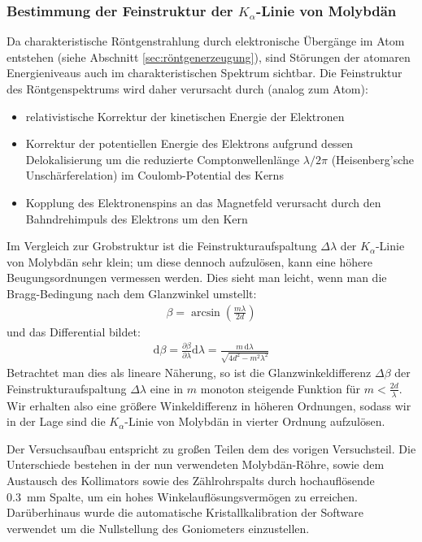 \documentclass[11pt, a4paper]{article}
\begin{document}
\subsubsection{Bestimmung der Feinstruktur der $K_\alpha$-Linie von Molybdän}
Da charakteristische Röntgenstrahlung durch elektronische Übergänge im Atom entstehen (siehe Abschnitt \ref{sec:röntgenerzeugung}), sind Störungen der atomaren Energieniveaus auch im charakteristischen Spektrum sichtbar.
Die Feinstruktur des Röntgenspektrums wird daher verursacht durch (analog zum Atom):
\begin{itemize}
  \item relativistische Korrektur der kinetischen Energie der Elektronen
  
  \item Korrektur der potentiellen Energie des Elektrons aufgrund dessen Delokalisierung um die reduzierte Comptonwellenlänge $\lambda / 2\pi$ (Heisenberg'sche Unschärferelation) im Coulomb-Potential des Kerns
  
  \item Kopplung des Elektronenspins an das Magnetfeld verursacht durch den Bahndrehimpuls des Elektrons um den Kern
\end{itemize}
Im Vergleich zur Grobstruktur ist die Feinstrukturaufspaltung $\Delta \lambda$ der $K_\alpha$-Linie von Molybdän sehr klein; um diese dennoch aufzulösen, kann eine höhere Beugungsordnungen vermessen werden.
Dies sieht man leicht, wenn man die Bragg-Bedingung nach dem Glanzwinkel umstellt:
\begin{align}
  \beta = \arcsin \left( \frac{m \lambda}{2 d} \right)
\end{align}
und das Differential bildet:
\begin{align}
  \mathrm{d}\beta = \frac{\partial \beta}{\partial \lambda} \mathrm{d}\lambda = \frac{m\, \mathrm{d}\lambda}{\sqrt{4 d^2 - m^2 \lambda^2}}
\end{align}
Betrachtet man dies als lineare Näherung, so ist die Glanzwinkeldifferenz $\Delta \beta$ der Feinstrukturaufspaltung $\Delta \lambda$ eine in $m$ monoton steigende Funktion für $m < \frac{2d}{\lambda}$.
Wir erhalten also eine größere Winkeldifferenz in höheren Ordnungen, sodass wir in der Lage sind die $K_\alpha$-Linie von Molybdän in vierter Ordnung aufzulösen.

Der Versuchsaufbau entspricht zu großen Teilen dem des vorigen Versuchsteil.
Die Unterschiede bestehen in der nun verwendeten Molybdän-Röhre, sowie dem Austausch des Kollimators sowie des Zählrohrspalts durch hochauflösende \SI{0,3}{\milli\metre} Spalte, um ein hohes Winkelauflösungsvermögen zu erreichen.
Darüberhinaus wurde die automatische Kristallkalibration der Software verwendet um die Nullstellung des Goniometers einzustellen.
\end{document}
